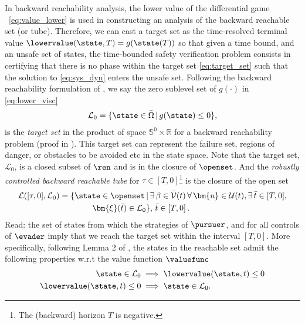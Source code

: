 In backward reachability analysis, the lower value of the differential game \ie ~\eqref{eq:value_lower} is used in constructing an analysis of the backward reachable set (or tube). Therefore, we can cast a target set as the time-resolved terminal value $\lowervalue(\state, T) = g(\state(T))$ so that given a time bound, and an unsafe set of states, the time-bounded safety verification problem consists in certifying that there is no phase within the target set \eqref{eq:target_set} such that the solution to \eqref{eq:sys_dyn} enters the unsafe set. Following the backward reachability formulation of \cite{Mitchell2005}, we say the zero sublevel set of $g(\cdot)$ in \eqref{eq:lower_visc} \ie
%
\begin{align}
	\mathcal{L}_0 = \{ \state \in \bar{\Omega} \,|\, g(\state) \le 0 \},
	\label{eq:target_set}
\end{align}
%
is the \textit{target set} in the product of space $\mathbb{S}^0 \times \mathbb{R}$ for a backward reachability problem (proof in \cite{Mitchell2005}). This target set can represent the failure set, regions of danger, or obstacles to be avoided etc in the state space. Note that the target set, $\mathcal{L}_0$, is a closed subset of $\ren$ and is in the closure of $\openset$. And the \textit{robustly controlled backward reachable tube} for $\tau \in [T, 0]$\footnote{The (backward) horizon $T$ is negative.} is the closure of the open set
%
\begin{align}
	\mathcal{L}([\tau, 0], \mathcal{L}_0) &= \{\state \in \openset \,| \, \exists \, \beta \in \mathcal{\bar{V}}(t) \,  \forall \, \bm{u} \in \mathcal{U}(t), \exists \, \bar{t} \in [T, 0], \nonumber \\
	& \qquad  \qquad \bm{\xi}(\bar{t})%
	 \in  \mathcal{L}_0 \}, \,\bar{t} \in \left[T, 0\right].
	 \label{eq:rcbrt}
\end{align}
%
Read: the set of states from which the strategies of $\pursuer$, and for all controls of $\evader$ imply that we reach the target set within the interval $[T, 0]$.   More specifically, following Lemma 2 of \cite{Mitchell2005}, the states in the reachable set admit the following properties w.r.t the value function $\valuefunc$
%
\begin{subequations}
	\begin{align}
		\state \in \mathcal{L}_0 &\implies \lowervalue(\state, t) \le 0 \\
		\lowervalue(\state, t) \le 0 &\implies \state \in \mathcal{L}_0.
	\end{align}
\end{subequations}

